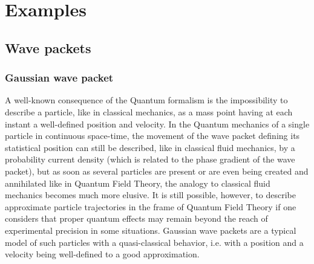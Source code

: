 \documentclass[10pt,a4paper,twoside,openany]{book}
\begin{document}
\part{Examples}

\chapter{Wave packets}
\label{Wave packets}

\section{Gaussian wave packet}

A well-known consequence of the Quantum formalism is the impossibility to describe a particle, like in classical mechanics, as a mass point having at each instant a well-defined position and velocity. In the Quantum mechanics of a single particle in continuous space-time, the movement of the wave packet defining its statistical position can still be described, like in classical fluid mechanics, by a probability current density (which is related to the phase gradient of the wave packet), but as soon as several particles are present or are even being created and annihilated like in Quantum Field Theory, the analogy to classical fluid mechanics becomes much more elusive. It is still possible, however, to describe approximate particle trajectories in the frame of Quantum Field Theory if one considers that proper quantum effects may remain beyond the reach of experimental precision in some situations. Gaussian wave packets are a typical model of such particles with a quasi-classical behavior, i.e. with a position and a velocity being well-defined to a good approximation.
\end{document}
